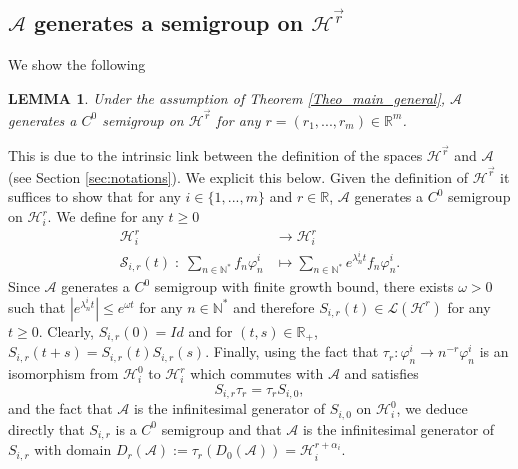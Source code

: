 \documentclass[11pt, dvipsnames]{amsart}
\newtheorem{lem}[theorem]{LEMMA}
\begin{document}
\subsection{$\mathcal{A}$ generates a semigroup on $\mathcal{H}^{\vec r}$}
\label{app:semigroup}
We show the following
\begin{lem}
\label{lem:semigroup}
Under the assumption of Theorem \ref{Theo_main_general}, $\mathcal{A}$ generates a $C^{0}$ semigroup on $\mathcal{H}^{\vec r}$ for any $r=(r_{1},...,r_{m})\in \mathbb{R}^{m}$. 
\end{lem}
This is due to the intrinsic link between the definition of the spaces $\mathcal{H}^{\vec r}$ and $\mathcal{A}$ (see Section \ref{sec:notations}). We explicit this below. Given the definition of $\mathcal{H}^{\vec r}$ it suffices to show that for any $i\in\{1,...,m\}$ and $r\in\mathbb{R}$, $\mathcal{A}$ generates a $C^{0}$ semigroup on $\mathcal{H}^{r}_{i}$.
We define for any $t\geq0$
\begin{equation}
\begin{split}
     \mathcal{H}^{r}_{i}&\rightarrow \mathcal{H}^{r}_{i}\\
    \mathcal{S}_{i,r}(t) \;:\; \sum\limits_{n\in\mathbb{N}^{*}}f_{n}\varphi_{n}^{i} &\mapsto\sum\limits_{n\in\mathbb{N}^{*}}e^{\lambda_{n}^{i}t}f_{n}\varphi_{n}^{i}.
    \end{split}
\end{equation}
Since $\mathcal{A}$ generates a $C^{0}$ semigroup with finite growth bound, there exists $\omega>0$ such that $|e^{\lambda_{n}^{i} t}|\leq e^{\omega t}$ for any $n\in\mathbb{N}^{*}$ and therefore $S_{i,r}(t)\in\mathcal{L}(\mathcal{H}^{r})$ for any $t\geq 0$. Clearly, $S_{i,r}(0) = Id$ and for $(t,s)\in\mathbb{R}_{+}$, 
    $S_{i,r}(t+s) = S_{i,r}(t)S_{i,r}(s)$. 
    Finally, using the fact that $\tau_{r}: \varphi_{n}^{i}\rightarrow n^{-r}\varphi_{n}^{i}$ is an isomorphism from $\mathcal{H}^{0}_{i}$ to $\mathcal{H}^{r}_{i}$ which commutes with $\mathcal{A}$ and satisfies
    \begin{equation}
        S_{i,r}\tau_{r} = \tau_{r} S_{i,0},
    \end{equation}
    and the fact that $\mathcal{A}$ is the infinitesimal generator of $S_{i,0}$ on $\mathcal{H}_{i}^{0}$, we deduce directly that $S_{i,r}$ is a $C^{0}$ semigroup and that $\mathcal{A}$ is the infinitesimal generator of $S_{i,r}$ with domain $D_{r}(\mathcal{A}):=\tau_{r}(D_{0}(\mathcal{A})) = \mathcal{H}^{r+\alpha_{i}}_{i}$.
\end{document}
